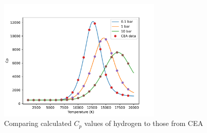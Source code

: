         \begin{figure}[!ht]
            \centering
            \includegraphics[width=0.7\textwidth]{assets/2 models/Cp_compare.pdf}
            \caption{Comparing calculated $C_p$ values of hydrogen to those from CEA}
            \label{fig:Cp_compare}
        \end{figure}




